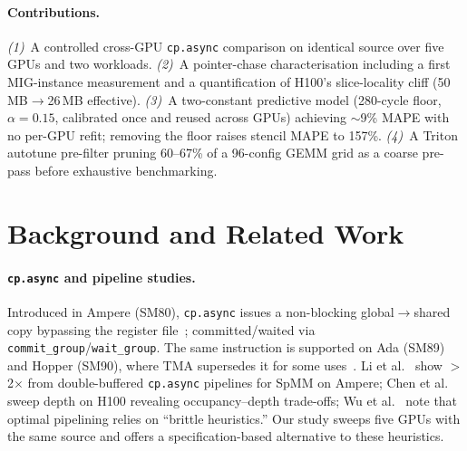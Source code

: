\documentclass[10pt,twocolumn]{article}
\newcommand{\cpasync}{\texttt{cp.async}}
\begin{document}
\paragraph{Contributions.}
\emph{(1)}~A controlled cross-GPU \cpasync{} comparison on identical
source over five GPUs and two workloads.
\emph{(2)}~A pointer-chase characterisation including a first
MIG-instance measurement and a quantification of H100's
slice-locality cliff (50\,MB$\to$26\,MB effective).
\emph{(3)}~A two-constant predictive model (280-cycle floor,
$\alpha{=}0.15$, calibrated once and reused across GPUs) achieving
$\sim$9\% MAPE with no per-GPU refit; removing the floor raises
stencil MAPE to 157\%.
\emph{(4)}~A Triton autotune pre-filter pruning 60--67\% of a
96-config GEMM grid as a coarse pre-pass before exhaustive
benchmarking.

\section{Background and Related Work}
\label{sec:related}

\paragraph{\cpasync{} and pipeline studies.}
Introduced in Ampere (SM80), \cpasync{} issues a non-blocking
global$\to$shared copy bypassing the register file~\cite{cuda_guide};
committed/waited via \texttt{commit\_group}/\texttt{wait\_group}.
The same instruction is supported on Ada (SM89) and Hopper (SM90),
where TMA supersedes it for some uses~\cite{hopper_ieee,hopper_microbench}.
Li et al.~\cite{dtcspmm} show $>$2$\times$ from double-buffered
\cpasync{} pipelines for SpMM on Ampere; Chen et al.~\cite{tawa}
sweep depth on H100 revealing occupancy--depth trade-offs; Wu et
al.~\cite{twill} note that optimal pipelining relies on ``brittle
heuristics.''  Our study sweeps five GPUs with the same source and
offers a specification-based alternative to these heuristics.
\end{document}
